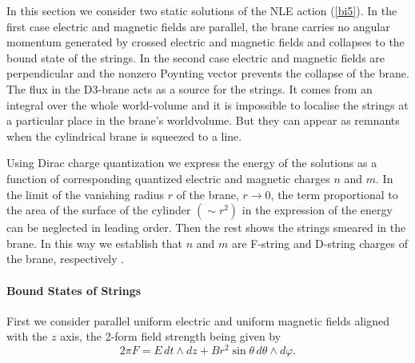 \documentclass[a4paper,12pt]{article}
\begin{document}
\noindent

In this section we consider two static solutions of the NLE action 
(\ref{bi5}). In the first case electric and magnetic fields are parallel, 
the brane carries no angular momentum generated by crossed electric and 
magnetic fields and collapses to the bound state of the strings. In the second 
case electric and magnetic fields are perpendicular and the nonzero Poynting 
vector prevents the collapse of the brane. The flux in the D3-brane acts as 
a source for the strings. It comes 
from an integral over the whole world-volume and it is impossible to localise
the strings at a particular place in the brane's worldvolume. But they can 
appear as remnants when the cylindrical brane is squeezed to a line.

\noindent

Using Dirac charge quantization we express the 
energy of the solutions as a function of corresponding quantized electric and 
magnetic charges $n$ and $m$. In the limit of the vanishing radius $r$ 
of the brane, $r\rightarrow 0$, the term proportional to the area of the 
surface of the cylinder $(\sim r^2)$ in the expression of the energy  
can be neglected in leading order. Then the rest shows the strings smeared in 
the brane. In this way we establish that $n$ and $m$ are F-string and 
D-string charges of the brane, respectively .

\paragraph{Bound States of Strings}

\noindent

First we consider parallel uniform electric and uniform magnetic fields 
aligned with the $z$ axis, the 2-form field strength being given by
\begin{equation}
2\pi F=E\,dt\land dz+Br^2\sin\theta\,d\theta\land d\varphi.
\label{c1}
\end{equation}
\end{document}
